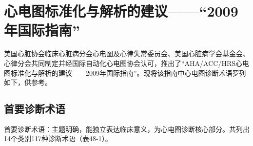 \section{心电图标准化与解析的建议------“2009年国际指南”}

美国心脏协会临床心脏病分会心电图及心律失常委员会、美国心脏病学会基金会、心律分会共同制定并经国际自动化心电图协会认可，推出了“AHA/ACC/HRS心电图标准化与解析的建议------2009年国际指南”。现将该指南中心电图诊断术语罗列如下，供参考。

\protect\hypertarget{text00057.htmlux5cux23subid703}{}{}

\subsection{首要诊断术语}

首要诊断术语：主题明确，能独立表达临床意义，为心电图诊断核心部分。共列出14个类别117种诊断术语（表48-1）。

